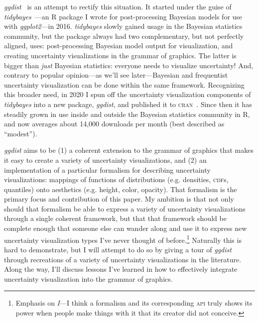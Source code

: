 \documentclass[journal]{vgtc}                     %
\begin{document}
\textit{ggdist}~\cite{kay2023ggdist} is an attempt to rectify this situation. It started under the guise of \textit{tidybayes}~\cite{kay2023tidybayes}---an R package I wrote for post-processing Bayesian models for use with \textit{ggplot2}---in 2016. \textit{tidybayes} slowly gained usage in the Bayesian statistics community, but the package always had two complementary, but not perfectly aligned, uses: post-processing Bayesian model output for visualization, and creating uncertainty visualizations in the grammar of graphics. The latter is bigger than \textit{just} Bayesian statistics: everyone needs to visualize uncertainty! And, contrary to popular opinion---as we'll see later---Bayesian and frequentist uncertainty visualization can be done within the same framework. Recognizing this broader need, in 2020 I spun off the uncertainty visualization components of \textit{tidybayes} into a new package, \textit{ggdist}, and published it to \textsc{cran}~\cite{hornik2012cran}. Since then it has steadily grown in use inside and outside the Bayesian statistics community in R, and now averages about 14,000 downloads per month (best described as ``modest''). %

\textit{ggdist} aims to be (1) a coherent extension to the grammar of graphics that makes it easy to create a variety of uncertainty visualizations, and (2) an implementation of a particular formalism for describing uncertainty visualizations: mappings of functions of distributions (e.g. densities, \textsc{cdf}s, quantiles) onto aesthetics (e.g. height, color, opacity). That formalism is the primary focus and contribution of this paper. My ambition is that not only should that formalism be able to express a variety of uncertainty visualizations through a single coherent framework, but that that framework should be complete enough that someone else can wander along and use it to express new uncertainty visualization types I've never thought of before.\footnote{Emphasis on \textit{I}---I think a formalism and its corresponding \textsc{api} truly shows its power when people make things with it that its creator did not conceive.} Naturally this is hard to demonstrate, but I will attempt to do so by giving a tour of \textit{ggdist} through recreations of a variety of uncertainty visualizations in the literature. Along the way, I'll discuss lessons I've learned in how to effectively integrate uncertainty visualization into the grammar of graphics.

\end{document}

